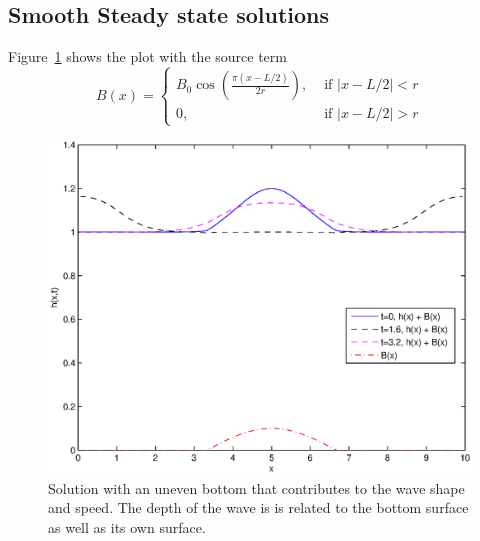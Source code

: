 

\subsection{Smooth Steady state solutions} %
\label{sub:smooth_steady_state_solutions}

Figure~\ref{fig:Figures_steadySolutionsp1_n_is_80_a_0} shows the plot with the source term
\begin{equation}
	B(x) = \begin{cases}
		B_0 \cos \left( \frac{\pi(x-L/2)}{2r} \right), &\text{ if }|x-L/2|<r\\
		0, &\text{ if }|x-L/2|>r
	\end{cases}
	\label{eq:bxEquation}
\end{equation} %
\begin{figure}[htbp]
	\centering
		\includegraphics[width=\MyWidth]{Figures/steadySolutionsp1_n_is_80_a_0.eps}
	\caption{Solution with an uneven bottom that contributes to the wave shape and speed.  The depth of the wave is is related to the bottom surface as well as its own surface.} 
	\label{fig:Figures_steadySolutionsp1_n_is_80_a_0}
\end{figure}%